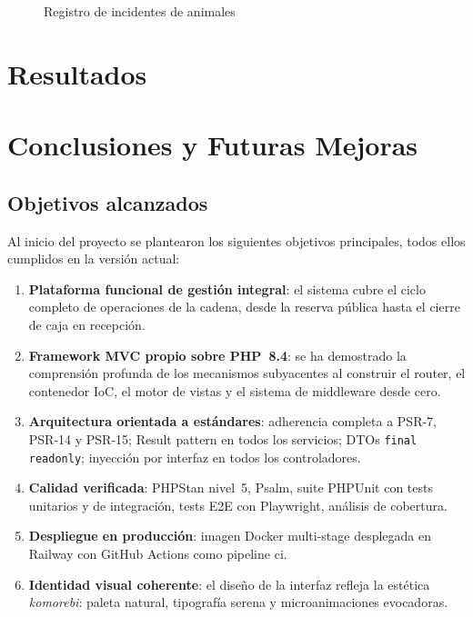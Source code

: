 \documentclass[12pt,a4paper,twoside,openright]{report}
\begin{document}
\begin{figure}[H]
  \centering
  \fbox{\rule{0pt}{6cm}\rule{12cm}{0pt}}
  \caption{Registro de incidentes de animales}
  \label{fig:62-keeper-incidents}
\end{figure}

\chapter{Resultados}
\label{ch:resultados}

\chapter{Conclusiones y Futuras Mejoras}
\label{ch:conclusiones}

\section{Objetivos alcanzados}
\label{sec:objetivos-alcanzados}

Al inicio del proyecto se plantearon los siguientes objetivos principales, todos
ellos cumplidos en la versión actual:

\begin{enumerate}
  \item \textbf{Plataforma funcional de gestión integral}: el sistema cubre el ciclo
    completo de operaciones de la cadena, desde la reserva pública hasta el cierre
    de caja en recepción.
  \item \textbf{Framework MVC propio sobre PHP~8.4}: se ha demostrado la comprensión
    profunda de los mecanismos subyacentes al construir el router, el contenedor IoC,
    el motor de vistas y el sistema de middleware desde cero.
  \item \textbf{Arquitectura orientada a estándares}: adherencia completa a PSR-7,
    PSR-14 y PSR-15; Result pattern en todos los servicios; DTOs \texttt{final readonly};
    inyección por interfaz en todos los controladores.
  \item \textbf{Calidad verificada}: PHPStan nivel~5, Psalm, suite PHPUnit con tests
    unitarios y de integración, tests E2E con Playwright, análisis de cobertura.
  \item \textbf{Despliegue en producción}: imagen Docker multi-stage desplegada en
    Railway con GitHub Actions como pipeline \gls{ci}.
  \item \textbf{Identidad visual coherente}: el diseño de la interfaz refleja la
    estética \textit{komorebi}: paleta natural, tipografía serena y microanimaciones
    evocadoras.
\end{enumerate}
\end{document}
